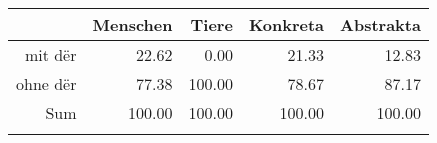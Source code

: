 \begin{tabular}{rrrrr}
  \lsptoprule
 & Menschen & Tiere & Konkreta & Abstrakta \\ 
  \midrule
mit dër & 22.62 & 0.00 & 21.33 & 12.83 \\ 
  ohne dër & 77.38 & 100.00 & 78.67 & 87.17 \\ 
  Sum & 100.00 & 100.00 & 100.00 & 100.00 \\ 
   \lspbottomrule
\end{tabular}
